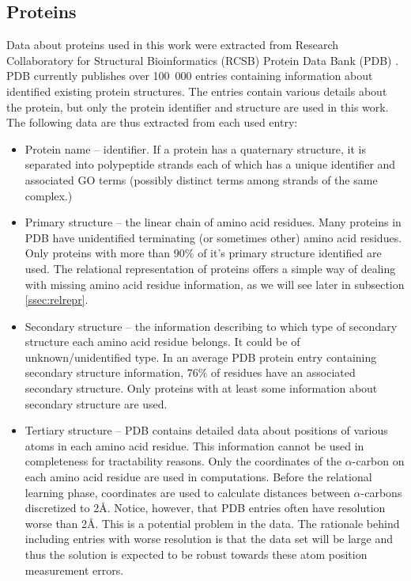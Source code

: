 \documentclass[11pt,twoside,a4paper]{book}
\begin{document}
\subsection{Proteins}
\label{ssec:proteins}
Data about proteins used in this work were extracted from Research Collaboratory for Structural Bioinformatics (RCSB) Protein Data Bank (PDB) \cite{pdb}.
PDB currently publishes over 100~000 entries containing information about identified existing protein structures.
The entries contain various details about the protein,
but only the protein identifier and structure are used in this work.
The following data are thus extracted from each used entry:
\begin{itemize}
 \item Protein name -- identifier. If a protein has a quaternary structure,
 it is separated into polypeptide strands each of which has a unique identifier and associated GO terms
 (possibly distinct terms among strands of the same complex.)
 \item Primary structure -- the linear chain of amino acid residues.
 Many proteins in PDB have unidentified terminating (or sometimes other) amino acid residues.
 Only proteins with more than 90\% of it's primary structure identified are used.
 The relational representation of proteins offers a simple way of dealing with missing amino
 acid residue information, as we will see later in subsection \ref{ssec:relrepr}.
 \item Secondary structure -- the information describing to which type of secondary structure each amino acid residue belongs.
 It could be of unknown/unidentified type. In an average PDB protein entry containing secondary structure information, 76\% of residues have an associated secondary structure.
 Only proteins with at least some information about secondary structure are used.
 \item Tertiary structure -- PDB contains detailed data about positions of various atoms in each amino acid residue.
 This information cannot be used in completeness for tractability reasons. 
 Only the coordinates of the $\alpha$-carbon on each amino acid residue are used in computations.
 Before the relational learning phase, coordinates are used to calculate distances between $\alpha$-carbons discretized to 2Å.
 Notice, however, that PDB entries often have resolution worse than 2Å.
 This is a potential problem in the data.
 The rationale behind including entries with worse resolution is that the data set will be large and thus the solution
 is expected to be robust towards these atom position measurement errors.
\end{itemize}
\end{document}
